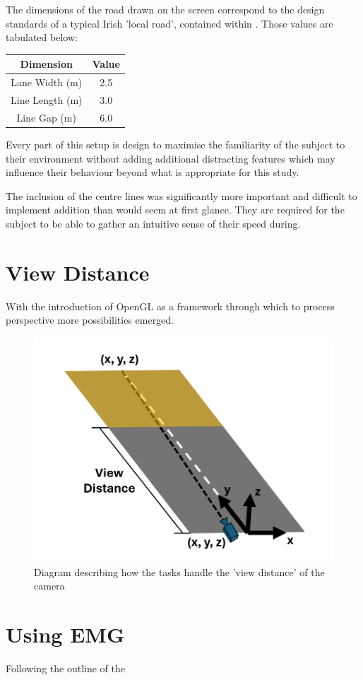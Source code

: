 The dimensions of the road drawn on the screen correspond to the design standards of a typical Irish 'local road', contained within \citet{dotDesignManualUrban2013}. Those values are tabulated below:
\begin{center}
\begin{tabular}{|c|c|}\hline
    Dimension           &   Value   \\\hline
    Lane Width (m)      &   2.5     \\\hline
    Line Length (m)     &   3.0     \\\hline
    Line Gap    (m)     &   6.0     \\\hline
\end{tabular}
\end{center}

Every part of this setup is design to maximise the familiarity of the subject to their environment without adding additional distracting features which may influence their behaviour beyond what is appropriate for this study.

The inclusion of the centre lines was significantly more important and difficult to implement addition than would seem at first glance. They are required for the subject to be able to gather an intuitive sense of their speed during.
\section{View Distance}
With the introduction of OpenGL as a framework through which to process perspective more possibilities emerged.
\begin{figure}[hbt!]
    \centering
    \includegraphics[width=0.45\linewidth]{figures/Camera Viewing.png}
    \caption{Diagram describing how the tasks handle the 'view distance' of the camera}
    \label{fig:ViewDist}
\end{figure}

\section{Using EMG}
Following the outline of the 


